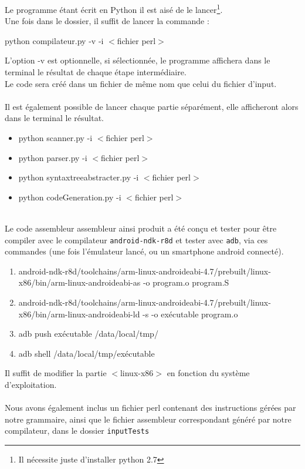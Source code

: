 \documentclass[a4paper,10pt]{article}
\begin{document}
Le programme étant écrit en Python il est aisé de le lancer\footnote{Il nécessite juste d'installer python 2.7}.\\
Une fois dans le dossier, il suffit de lancer la commande :
\begin{center}
	python compilateur.py -v -i  $<$fichier perl$>$
\end{center}
L'option -v est optionnelle, si sélectionnée, le programme affichera dans le terminal le résultat de chaque étape intermédiaire.\\
Le code sera créé dans un fichier de même nom que celui du fichier d'input.\\
~\\
Il est également possible de lancer chaque partie séparément, elle afficheront alors dans le terminal le résultat.
\begin{itemize}
	\item python scanner.py -i $<$fichier perl$>$ 
	\item python parser.py -i $<$fichier perl$>$ 
	\item python syntaxtreeabstracter.py -i $<$fichier perl$>$
	\item python codeGeneration.py -i $<$fichier perl$>$ 
\end{itemize}
~\\
Le code assembleur assembleur ainsi produit a été conçu et tester pour être compiler avec le compilateur \verb?android-ndk-r8d? et tester avec \verb?adb?, via ces commandes (une fois l'émulateur lancé, ou un smartphone android connecté).
\begin{enumerate}
\item	android-ndk-r8d/toolchains/arm-linux-androideabi-4.7/prebuilt/linux-x86/bin/arm-linux-androideabi-as -o program.o program.S
\item	android-ndk-r8d/toolchains/arm-linux-androideabi-4.7/prebuilt/linux-x86/bin/arm-linux-androideabi-ld -s -o exécutable program.o
\item	adb push exécutable /data/local/tmp/
\item	adb shell /data/local/tmp/exécutable
\end{enumerate}
Il suffit de modifier la partie $<$linux-x86$>$ en fonction du système d'exploitation.\\
~\\
Nous avons également inclus un fichier perl contenant des instructions gérées par notre grammaire, ainsi que le fichier assembleur correspondant généré par notre compilateur, dans le dossier \verb?inputTests?
\end{document}
